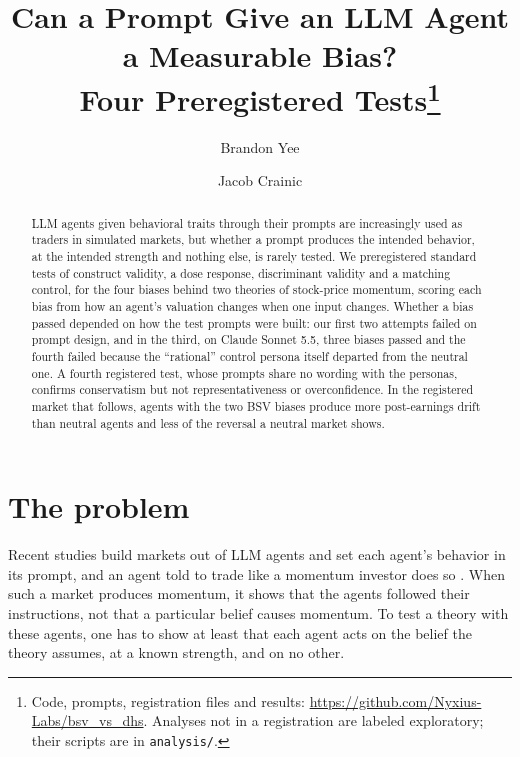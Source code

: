 \documentclass[10pt]{article}
\title{\vspace{-0.5in}\textbf{Can a Prompt Give an LLM Agent a Measurable Bias?\\Four Preregistered Tests}\thanks{Code, prompts, registration files and results: \url{https://github.com/Nyxius-Labs/bsv_vs_dhs}. Analyses not in a registration are labeled exploratory; their scripts are in \texttt{analysis/}.}\vspace{-0.1in}}
\author{Brandon Yee \and Jacob Crainic}
\date{}
\begin{document}
\maketitle
\vspace{-0.35in}

\begin{abstract}
\noindent LLM agents given behavioral traits through their prompts are increasingly used as traders in simulated markets, but whether a prompt produces the intended behavior, at the intended strength and nothing else, is rarely tested. We preregistered standard tests of construct validity, a dose response, discriminant validity and a matching control, for the four biases behind two theories of stock-price momentum, scoring each bias from how an agent's valuation changes when one input changes. Whether a bias passed depended on how the test prompts were built: our first two attempts failed on prompt design, and in the third, on Claude Sonnet 5.5, three biases passed and the fourth failed because the ``rational'' control persona itself departed from the neutral one. A fourth registered test, whose prompts share no wording with the personas, confirms conservatism but not representativeness or overconfidence. In the registered market that follows, agents with the two BSV biases produce more post-earnings drift than neutral agents and less of the reversal a neutral market shows.
\end{abstract}

\section{The problem}

Recent studies build markets out of LLM agents and set each agent's behavior in its prompt, and an agent told to trade like a momentum investor does so \citep{lopezlira2025trade,horton2023homo,yang2025twinmarket}. When such a market produces momentum, it shows that the agents followed their instructions, not that a particular belief causes momentum. To test a theory with these agents, one has to show at least that each agent acts on the belief the theory assumes, at a known strength, and on no other.
\end{document}
